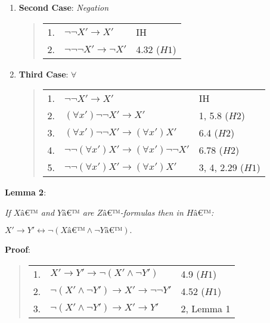 \documentclass[12pt]{article}
\begin{document}
\begin{itemize}
\begin{enumerate}
\item \textbf{Second Case}: \emph{Negation}

\begin{quote}
\begin{tabular}{lll}
1.&$\neg \neg X' \rightarrow X'$&IH\\
2.&$\neg \neg \neg X' \rightarrow \neg X'$&4.32 ($H1$)
\end{tabular}
\end{quote}

\item \textbf{Third Case}: $\forall$                                     

\begin{quote}
\begin{tabular}{lll}
1.&$\neg \neg X' \rightarrow X'$&IH\\
2.&$(\forall x') \neg \neg X' \rightarrow X'$&1, 5.8 ($H2$)\\
3.&$(\forall x') \neg \neg X' \rightarrow (\forall x') X'$&6.4 ($H2$)\\
4.&$\neg \neg (\forall x') X' \rightarrow (\forall x') \neg \neg X'$&6.78 ($H2$)\\
5.&$\neg \neg (\forall x') X' \rightarrow (\forall x') X'$&3, 4, 2.29 ($H1$)
\end{tabular}
\end{quote}

\end{enumerate}
\end{itemize}

\medskip
\textbf{Lemma 2}:

\begin{center}
\emph{If $Xâ€™$ and $Yâ€™$ are $Zâ€™$-formulas then in $Hâ€™$:}

$X' \rightarrow Y' \leftrightarrow \neg (Xâ€™ \wedge \neg Yâ€™).$
\end{center}

\medskip
\textbf{Proof}:

\begin{quote}
\begin{tabular}{lll}
1.&$X' \rightarrow Y' \rightarrow \neg (X' \wedge \neg Y')$&4.9 ($H1$)\\
2.&$\neg (X' \wedge \neg Y') \rightarrow X' \rightarrow \neg \neg Y'$&4.52 ($H1$)\\
3.&$\neg (X' \wedge \neg Y') \rightarrow X' \rightarrow Y'$&2, Lemma 1
\end{tabular}
\end{quote} 
\end{document}
